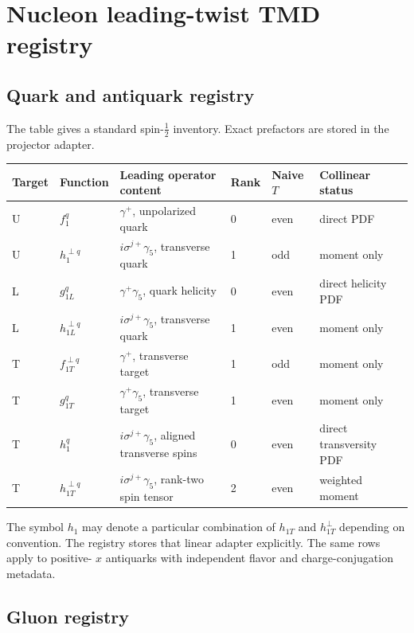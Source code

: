 \documentclass[11pt]{article}
\begin{document}
\section{Nucleon leading-twist TMD registry}
\label{app:tmd-registry}

\subsection{Quark and antiquark registry}

The table gives a standard spin-\(\tfrac12\) inventory.  Exact prefactors are
stored in the projector adapter.

\begingroup
\setlength{\tabcolsep}{3pt}
\begin{longtable}{L{0.10\textwidth}L{0.16\textwidth}L{0.22\textwidth}L{0.08\textwidth}L{0.11\textwidth}L{0.22\textwidth}}
\toprule
Target & Function & Leading operator content & Rank & Naive \(T\) & Collinear status\\
\midrule
\endhead
U & \(f_1^q\) & \(\gamma^+\), unpolarized quark & 0 & even & direct PDF\\
U & \(h_1^{\perp q}\) & \(i\sigma^{j+}\gamma_5\), transverse quark & 1 & odd & moment only\\
L & \(g_{1L}^q\) & \(\gamma^+\gamma_5\), quark helicity & 0 & even & direct helicity PDF\\
L & \(h_{1L}^{\perp q}\) & \(i\sigma^{j+}\gamma_5\), transverse quark & 1 & even & moment only\\
T & \(f_{1T}^{\perp q}\) & \(\gamma^+\), transverse target & 1 & odd & moment only\\
T & \(g_{1T}^q\) & \(\gamma^+\gamma_5\), transverse target & 1 & even & moment only\\
T & \(h_1^q\) & \(i\sigma^{j+}\gamma_5\), aligned transverse spins & 0 & even & direct transversity PDF\\
T & \(h_{1T}^{\perp q}\) & \(i\sigma^{j+}\gamma_5\), rank-two spin tensor & 2 & even & weighted moment\\
\bottomrule
\end{longtable}
\endgroup
The symbol \(h_1\) may denote a particular combination of
\(h_{1T}\) and \(h_{1T}^{\perp}\) depending on convention.  The registry
stores that linear adapter explicitly.  The same rows apply to positive-
\(x\) antiquarks with independent flavor and charge-conjugation metadata.

\subsection{Gluon registry}
\end{document}
